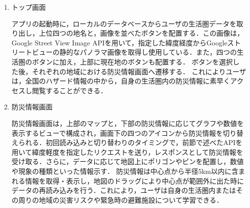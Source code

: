 \documentclass[a4paper]{jsarticle}
\begin{document}
\begin{enumerate}
  \item トップ画面

  アプリの起動時に，ローカルのデータベースからユーザの生活圏データを取り出し，上位四つの地名と，画像を並べたボタンを配置する．この画像は，Google Street View Image APIを用いて，指定した緯度経度からGoogleストリートビューの静的なパノラマ画像を取得し使用している．また，四つの生活圏のボタンに加え，上部に現在地のボタンも配置する．
  ボタンを選択した後，それぞれの地域における防災情報画面へ遷移する．
  これによりユーザは，全国のハザード情報の中から，自身の生活圏内の防災情報に素早くアクセスし閲覧することができる．

  \item 防災情報画面

  防災情報画面は，上部のマップと，下部の防災情報に応じてグラフや数値を表示するビューで構成され，画面下の四つのアイコンから防災情報を切り替えられる．初回読み込みと切り替わりのタイミングで，前節で述べたAPIを用いて緯度軽度を指定したリクエストを送り，レスポンスとして防災情報を受け取る．さらに，データに応じて地図上にポリゴンやピンを配置し，数値や現象の種類といった情報示す．
  防災情報は中心点から半径5km以内に含まれる情報を取得・表示し，地図のドラッグにより中心点が範囲外に出た時にデータの再読み込みを行う．これにより，ユーザは自身の生活圏内またはその周りの地域の災害リスクや緊急時の避難施設について学習できる．
\end{enumerate}
\end{document}

